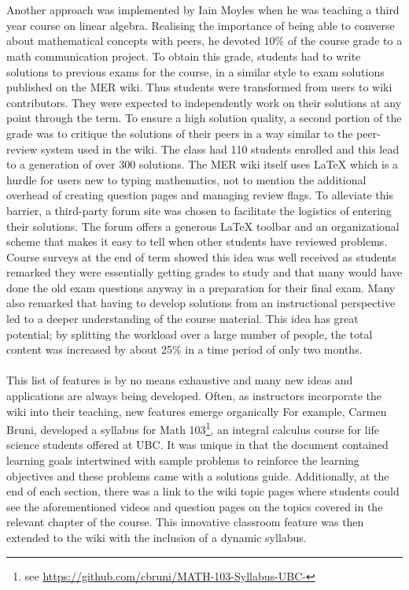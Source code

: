 \documentclass{primus}
\begin{document}
\\\\
\noindent{}Another approach was implemented by Iain Moyles when he was teaching a third year course on linear algebra. Realising the importance of being able to converse about mathematical concepts with peers, he devoted 10\% of the course grade to a math communication project. To obtain this grade, students had to write solutions to previous exams for the course, in a similar style to exam solutions published on the MER wiki. Thus students were transformed from users to wiki contributors. They were expected to independently work on their solutions at any point through the term. To ensure a high solution quality, a second portion of the grade was to critique the solutions of their peers in a way similar to the peer-review system used in the wiki. The class had 110 students enrolled and this lead to a generation of over 300 solutions. The MER wiki itself uses LaTeX which is a hurdle for users new to typing mathematics, not to mention the additional overhead of creating question pages and managing review flags. To alleviate this barrier, a third-party forum site was chosen to facilitate the logistics of entering their solutions. The forum offers a generous LaTeX toolbar and an organizational scheme that makes it easy to tell when other students have reviewed problems. Course surveys at the end of term showed this idea was well received as students remarked they were essentially getting grades to study and that many would have done the old exam questions anyway in a preparation for their final exam. Many also remarked that having to develop solutions from an instructional perspective led to a deeper understanding of the course material. This idea has great potential; by splitting the workload over a large number of people, the total content was increased by about 25\% in a time period of only two months.
\\\\
\noindent{}This list of features is by no means exhaustive and many new ideas and applications are always being developed.  Often, as instructors incorporate the wiki into their teaching, new features emerge organically  For example, Carmen Bruni, developed a syllabus for Math 103\footnote{see \url{https://github.com/cbruni/MATH-103-Syllabus-UBC-}}, an integral calculus course for life science students offered at UBC. It was unique in that the document contained learning goals intertwined with sample problems to reinforce the learning objectives and these problems came with a solutions guide. Additionally, at the end of each section, there was a link to the wiki topic pages where students could see the aforementioned videos and question pages on the topics covered in the relevant chapter of the course.  This innovative classroom feature was then extended to the wiki with the inclusion of a dynamic syllabus.
\end{document}
